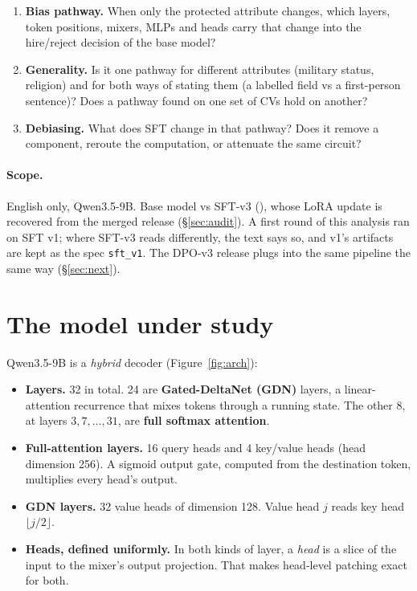 \documentclass[11pt,a4paper]{article}
\begin{document}
\begin{enumerate}[label=\textbf{Q\arabic*}]
  \item \textbf{Bias pathway.} When only the protected attribute changes, which layers, token
        positions, mixers, MLPs and heads carry that change into the hire/reject decision of the
        base model?
  \item \textbf{Generality.} Is it one pathway for different attributes (military status,
        religion) and for both ways of stating them (a labelled field vs a first-person sentence)?
        Does a pathway found on one set of CVs hold on another?
  \item \textbf{Debiasing.} What does SFT change in that pathway? Does it remove a component,
        reroute the computation, or attenuate the same circuit?
\end{enumerate}

\paragraph{Scope.} English only, Qwen3.5-9B. Base model vs SFT-v3
(), whose LoRA update is recovered
from the merged release (\S\ref{sec:audit}). A first round of this analysis ran on SFT v1; where
SFT-v3 reads differently, the text says so, and v1's artifacts are kept as the spec
\texttt{sft\_v1}. The DPO-v3 release plugs into the same pipeline the same way (\S\ref{sec:next}).

\section{The model under study}
\label{sec:model}

Qwen3.5-9B is a \emph{hybrid} decoder (Figure~\ref{fig:arch}):
\begin{itemize}
  \item \textbf{Layers.} 32 in total. 24 are \textbf{Gated-DeltaNet (GDN)} layers, a linear-attention
        recurrence that mixes tokens through a running state. The other 8, at layers
        $3,7,\dots,31$, are \textbf{full softmax attention}.
  \item \textbf{Full-attention layers.} 16 query heads and 4 key/value heads (head dimension 256).
        A sigmoid output gate, computed from the destination token, multiplies every head's output.
  \item \textbf{GDN layers.} 32 value heads of dimension 128. Value head $j$ reads key head
        $\lfloor j/2\rfloor$.
  \item \textbf{Heads, defined uniformly.} In both kinds of layer, a \emph{head} is a slice of the
        input to the mixer's output projection. That makes head-level patching exact for both.
\end{itemize}
\end{document}
